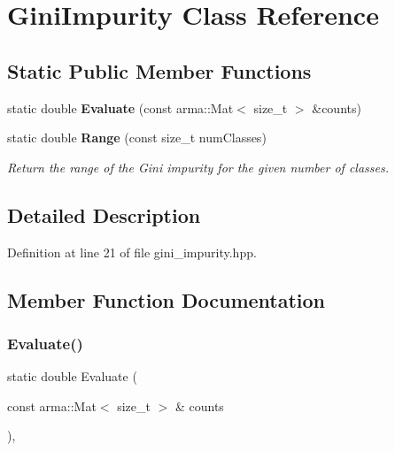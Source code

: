 \section{Gini\+Impurity Class Reference}
\label{classmlpack_1_1tree_1_1GiniImpurity}
\subsection*{Static Public Member Functions}
\begin{DoxyCompactItemize}
\item 
static double \textbf{ Evaluate} (const arma\+::\+Mat$<$ size\+\_\+t $>$ \&counts)
\item 
static double \textbf{ Range} (const size\+\_\+t num\+Classes)
\begin{DoxyCompactList}\small\item\em Return the range of the Gini impurity for the given number of classes. \end{DoxyCompactList}\end{DoxyCompactItemize}


\subsection{Detailed Description}


Definition at line 21 of file gini\+\_\+impurity.\+hpp.



\subsection{Member Function Documentation}
\mbox{\label{classmlpack_1_1tree_1_1GiniImpurity_a578c636308efbd492ea30e62f05f4d63}} 
\subsubsection{Evaluate()}
{\footnotesize\ttfamily static double Evaluate (\begin{DoxyParamCaption}\item[{const arma\+::\+Mat$<$ size\+\_\+t $>$ \&}]{counts }\end{DoxyParamCaption})\hspace{0.3cm}{\ttfamily [inline]}, {\ttfamily [static]}}



